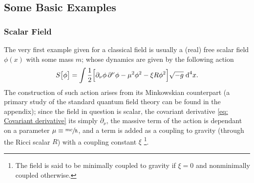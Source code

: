 \begin{comment}
	Therefore, we define the covariant derivative as
	\begin{equation}\label{eq: Covariant derivative}
		\nabla_\mu\Xi^{a_1,a_2,\hdots}_{\quad b_1,b_2,\hdots}\equiv \partial_\mu \Xi^{a_1,a_2,\hdots}_{\quad b_1,b_2,\hdots}+\Gamma_\mu+\Gamma^{a_1}_{\sigma\mu}\tilde\Xi^{\sigma,a_2,\hdots}_{\quad b_1,b_2,\hdots}+\hdots-\Gamma^{\sigma}_{b_1\mu}\tilde\Xi^{a_1,a_2,\hdots}_{\quad \sigma,b_2,\hdots}-\hdots.
	\end{equation}
	
	If the field $\Xi^{a_1,a_2,\hdots}_{\quad b_1,b_2,\hdots}$ is coupled to a vector field $A_\mu$ the covariant derivative must be redefined as $\nabla_\mu'\equiv\nabla_\mu-\frac{i}{\hbar}eA_\mu$, where $e$ would be the coupling constant.
\end{comment}


\subsection{Some Basic Examples}
\subsubsection{Scalar Field}
The very first example given for a classical field is usually a (real) free scalar field $\phi(x)$ with some mass $m$; whose dynamics are given by the following action
\begin{equation}\label{eq: General scalar field action}
	S\big[\phi\big]=\int\frac{1}{2}\Big[\partial_\nu\phi\,\partial^\nu\phi-\mu^2\phi^2-\xi R\phi^2\Big]\sqrt{-g}\;\text{d}^4 x.
\end{equation}
The construction of such action arises from its Minkowskian counterpart (a primary study of the standard quantum field theory can be found in the appendix); since the field in question is scalar, the covariant derivative \ref{eq: Covariant derivative} its simply $\partial_\nu$, the massive term of the action is dependant on a parameter $\mu\equiv\sfrac{mc}{\hbar}$, and a term is added as a coupling to gravity (through the Ricci scalar $R$) with a coupling constant $\xi$ \footnote{The field is said to be minimally coupled to gravity if $\xi=0$ and nonminimally coupled otherwise.}.

